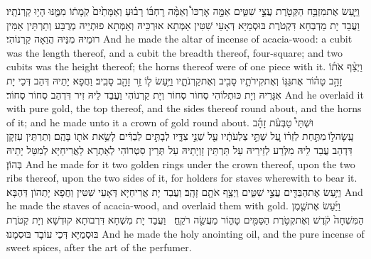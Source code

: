 {וַיַּ֛עַשׂ אֶת\maqqaf מִזְבַּ֥ח הַקְּטֹ֖רֶת עֲצֵ֣י שִׁטִּ֑ים אַמָּ֣ה אׇרְכּוֹ֩ וְאַמָּ֨ה רׇחְבּ֜וֹ רָב֗וּעַ וְאַמָּתַ֙יִם֙ קֹֽמָת֔וֹ מִמֶּ֖נּוּ הָי֥וּ קַרְנֹתָֽיו׃}
{וַעֲבַד יָת מַדְבְּחָא דִּקְטֹרֶת בּוּסְמַיָּא דְּאָעֵי שִׁטִּין אַמְּתָא אוּרְכֵּיהּ וְאַמְּתָא פוּתְיֵיהּ מְרֻבַּע וְתַרְתֵּין אַמִּין רוּמֵיהּ מִנֵּיהּ הֲוַאָה קַרְנוֹהִי׃}
{And he made the altar of incense of acacia-wood: a cubit was the length thereof, and a cubit the breadth thereof, four-square; and two cubits was the height thereof; the horns thereof were of one piece with it.}{}
{וַיְצַ֨ף אֹת֜וֹ זָהָ֣ב טָה֗וֹר אֶת\maqqaf גַּגּ֧וֹ וְאֶת\maqqaf קִירֹתָ֛יו סָבִ֖יב וְאֶת\maqqaf קַרְנֹתָ֑יו וַיַּ֥עַשׂ ל֛וֹ זֵ֥ר זָהָ֖ב סָבִֽיב׃}
{וַחֲפָא יָתֵיהּ דְּהַב דְּכֵי יָת אִגָּרֵיהּ וְיָת כּוּתְלוֹהִי סְחוֹר סְחוֹר וְיָת קַרְנוֹהִי וַעֲבַד לֵיהּ זִיר דִּדְהַב סְחוֹר סְחוֹר׃}
{And he overlaid it with pure gold, the top thereof, and the sides thereof round about, and the horns of it; and he made unto it a crown of gold round about.}{}
{וּשְׁתֵּי֩ טַבְּעֹ֨ת זָהָ֜ב עָֽשָׂה\maqqaf ל֣וֹ \legarmeh  מִתַּ֣חַת לְזֵר֗וֹ עַ֚ל שְׁתֵּ֣י צַלְעֹתָ֔יו עַ֖ל שְׁנֵ֣י צִדָּ֑יו לְבָתִּ֣ים לְבַדִּ֔ים לָשֵׂ֥את אֹת֖וֹ בָּהֶֽם׃}
{וְתַרְתֵּין עִזְקָן דִּדְהַב עֲבַד לֵיהּ מִלְּרַע לְזֵירֵיהּ עַל תַּרְתֵּין זָוְיָתֵיהּ עַל תְּרֵין סִטְרוֹהִי לְאַתְרָא לַאֲרִיחַיָּא לְמִטַּל יָתֵיהּ בְּהוֹן׃}
{And he made for it two golden rings under the crown thereof, upon the two ribs thereof, upon the two sides of it, for holders for staves wherewith to bear it.}{}
{וַיַּ֥עַשׂ אֶת\maqqaf הַבַּדִּ֖ים עֲצֵ֣י שִׁטִּ֑ים וַיְצַ֥ף אֹתָ֖ם זָהָֽב׃}
{וַעֲבַד יָת אֲרִיחַיָּא דְּאָעֵי שִׁטִּין וַחֲפָא יָתְהוֹן דַּהְבָּא׃}
{And he made the staves of acacia-wood, and overlaid them with gold.}{}
{וַיַּ֜עַשׂ אֶת\maqqaf שֶׁ֤מֶן הַמִּשְׁחָה֙ קֹ֔דֶשׁ וְאֶת\maqqaf קְטֹ֥רֶת הַסַּמִּ֖ים טָה֑וֹר מַעֲשֵׂ֖ה רֹקֵֽחַ׃ \setuma }
{וַעֲבַד יָת מִשְׁחָא דִּרְבוּתָא קוּדְשָׁא וְיָת קְטֹרֶת בּוּסְמַיָּא דְּכֵי עוֹבָד בּוּסְמָנוּ׃}
{And he made the holy anointing oil, and the pure incense of sweet spices, after the art of the perfumer.}{}

